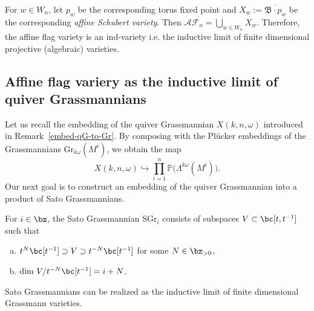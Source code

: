 \documentclass[10pt, a4paper, reqno]{amsart}
\begin{document}
\begin{rema}
	For $w\in W_n$, let $p_w$ be the corresponding torus fixed point and  $X_w:= \overline{\mathfrak{B}\cdot p_w}$ be  the corresponding \emph{affine Schubert variety}. Then  $\mathscr{AF}_n=\bigcup_{w\in W_n}X_w$. Therefore, the affine flag variety is an ind-variety i.e. the inductive limit of finite dimensional projective (algebraic) varieties.
\end{rema}




\subsection{Affine flag variery as the inductive limit of quiver Grassmannians}\label{ss:qGinafg}

Let us recall the embedding of the quiver Grassmannian \( X(k,n,\omega) \) introduced in Remark~\ref{embed-qG-to-Gr}.  
By composing with the Pl\"ucker embeddings of the Grassmannians \( \mathrm{Gr}_{k\omega}(M^i) \), we obtain the map  
\[
X(k,n,\omega)\hookrightarrow \prod_{i=1}^{n}\mathbb{P}\big(\Lambda^{k\omega}(M^i)\big).
\]
Our next goal is to construct an embedding of the quiver Grassmannian into a product of Sato Grassmannians.

\begin{defe}\label{defSGr}
	For $i\in\bz$, the Sato Grassmannian $\mbox{SGr}_i$ consists of subspaces $V\subset \bc[t,t^{-1}]$ such that 
	\begin{enumerate}[(a)]
		\item $t^N\bc[t^{-1}]\supset V\supset t^{-N}\bc[t^{-1}]$ for some $N\in\bz_{>0}$,
		\item $\mbox{dim}~V/ t^{-N}\bc[t^{-1}]=i+N$.
	\end{enumerate}\end{defe}
\begin{rema}
Sato Grassmannians can be realized as the inductive limit of finite dimensional Grassmann varieties.
\end{rema}	
\end{document}
